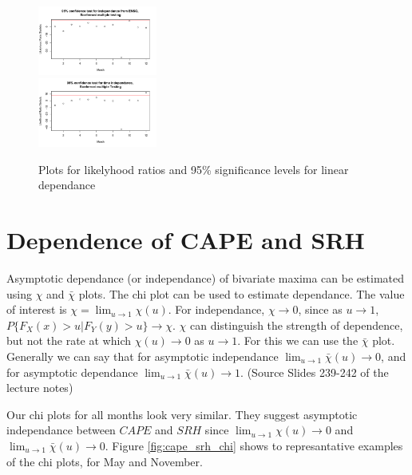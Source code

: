 \documentclass[10pt,conference,compsocconf]{IEEEtran}
\begin{document}
\begin{figure}
	\centering
	\includegraphics[width=0.35\textwidth]{../plots/enso_dependance_step.pdf}\\
	\includegraphics[width=0.35\textwidth]{../plots/time_dependance_step.pdf}
	\caption{Plots for likelyhood ratios and 95\% significance levels for linear dependance}
	\label{fig:dependance_test_step}
\end{figure}

\section*{Dependence of CAPE and SRH}
Asymptotic dependance (or independance) of bivariate maxima can be estimated using $\chi$ and $\bar{\chi}$ plots. The chi plot can be used to estimate dependance. The value of interest is $\chi = \lim_{u \to 1} \chi(u)$. For independance, $\chi \to 0$, since as $u \to 1$, $P\{F_X(x)>u | F_Y(y)>u\} \to \chi$. $\chi$ can distinguish the strength of dependence, but not the rate at which $\chi(u) \to 0$ as $u \to 1$. For this we can use the $\bar{\chi}$ plot. Generally we can say that for asymptotic independance $\lim_{u \to 1} \bar{\chi}(u) \to 0$, and for asymptotic dependance $\lim_{u \to 1} \bar{\chi}(u) \to 1$. (Source Slides 239-242 of the lecture notes)
\par
Our chi plots for all months look very similar. They suggest asymptotic independance between $CAPE$ and $SRH$ since $\lim_{u \to 1} \chi(u) \to 0$ and $\lim_{u \to 1} \bar{\chi}(u) \to 0$. Figure \ref{fig:cape_srh_chi} shows to represantative examples of the chi plots, for May and November. 
\end{document}
